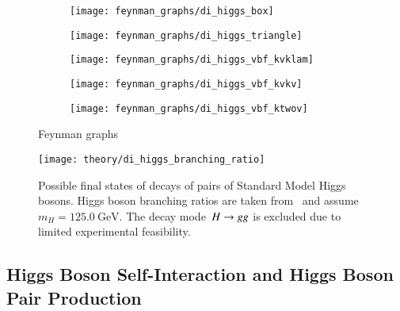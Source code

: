\begin{figure}[htbp]
  \centering

  \begin{subfigure}{0.49\textwidth}
    \centering
    \texttt{[image: feynman\_graphs/di\_higgs\_box]}
    \subcaption{}
  \end{subfigure}\hfill%
  \begin{subfigure}{0.49\textwidth}
    \centering
    \texttt{[image: feynman\_graphs/di\_higgs\_triangle]}
    \subcaption{}
  \end{subfigure}

  \vspace*{1em}

  \begin{subfigure}{0.33\textwidth}
    \centering
    \texttt{[image: feynman\_graphs/di\_higgs\_vbf\_kvklam]}
    \subcaption{}
  \end{subfigure}\hfill%
  \begin{subfigure}{0.33\textwidth}
    \centering
    \texttt{[image: feynman\_graphs/di\_higgs\_vbf\_kvkv]}
    \subcaption{}
  \end{subfigure}\hfill%
  \begin{subfigure}{0.33\textwidth}
    \centering
    \texttt{[image: feynman\_graphs/di\_higgs\_vbf\_ktwov]}
    \subcaption{}
  \end{subfigure}

  \caption{Feynman graphs}
  \label{fig:hh_feynmans}
\end{figure}



\begin{figure}[htbp]
  \centering
  \texttt{[image: theory/di\_higgs\_branching\_ratio]}
  \caption{Possible final states of decays of pairs of Standard Model Higgs
    bosons. Higgs boson branching ratios are taken from~\cite{deFlorian:2016spz}
    and assume~$m_{H} = \SI{125.0}{\GeV}$. The decay mode~$H \rightarrow g g$ is
    excluded due to limited experimental feasibility.}
  \label{fig:hh_branching_ratios}
\end{figure}



\clearpage
{}


\subsection{Higgs Boson Self-Interaction and Higgs Boson Pair Production}

